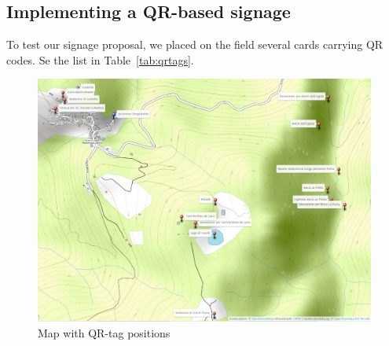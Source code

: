 \documentclass[sustainability,article,submit,pdftex,moreauthors]{Definitions/mdpi}
\begin{document}

\subsection{Implementing a QR-based signage}

To test our signage proposal, we placed on the field several cards carrying QR codes. Se the list in Table~\ref{tab:qrtags}.

\begin{figure}
	\centering
	\includegraphics[width=\linewidth]{figure/mappa}
	\caption[Map with QR-tag positions]{Map with QR-tag positions}
	\label{fig:mappa}
\end{figure}
\end{document}
